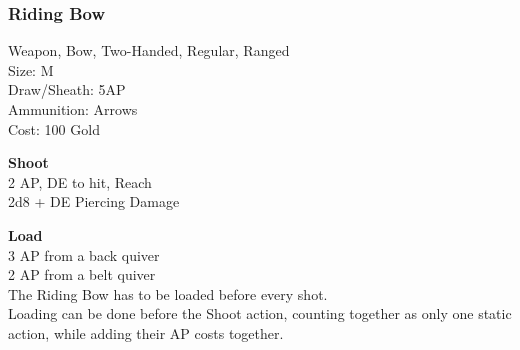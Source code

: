 \subsubsection{Riding Bow}\label{weapon:ridingBow}
Weapon, Bow, Two-Handed, Regular, Ranged\\
Size: M\\
Draw/Sheath: 5AP\\
Ammunition: Arrows\\
Cost: 100 Gold

\textbf{Shoot}\\
2 AP, DE to hit,  Reach\\
2d8 + \texttimes DE Piercing Damage

\textbf{Load}\\
3 AP from a back quiver\\
2 AP from a belt quiver\\
The Riding Bow has to be loaded before every shot.\\
Loading can be done before the Shoot action, counting together as only one static action, while adding their AP costs together.


